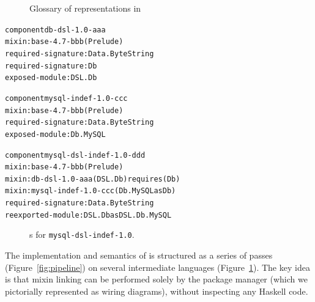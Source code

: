 \begin{figure}
\begin{mdframed}
\begin{description}
\end{description}
\caption{Glossary of representations in \Backpack{}}
\label{fig:glossary}
\end{mdframed}
\end{figure}

\newsavebox{\resolvedfullexample}
\begin{lrbox}{\resolvedfullexample}
\hspace{-1em}
\begin{minipage}{\linewidth}
\begin{alltt}
component db-dsl-1.0-aaa
 mixin: base-4.7-bbb (Prelude)
 required-signature: Data.ByteString
 required-signature: Db
 exposed-module: DSL.Db

component mysql-indef-1.0-ccc
 mixin: base-4.7-bbb (Prelude)
 required-signature: Data.ByteString
 exposed-module: Db.MySQL

component mysql-dsl-indef-1.0-ddd
 mixin: base-4.7-bbb (Prelude)
 mixin: db-dsl-1.0-aaa (DSL.Db) requires (Db)
 mixin: mysql-indef-1.0-ccc (Db.MySQL as Db)
 required-signature: Data.ByteString
 reexported-module: DSL.Db as DSL.Db.MySQL
\end{alltt}
\end{minipage}
\end{lrbox}

\begin{figure}
    \usebox{\resolvedfullexample}
  \caption{\Ccomp{}s for \texttt{mysql-dsl-indef-1.0}.}%
\label{fig:resolved-full-comps}
\end{figure}

The implementation and semantics of \Backpack{} is structured as a
series of passes (Figure~\ref{fig:pipeline}) on several intermediate
languages (Figure~\ref{fig:glossary}).  The key idea is that mixin
linking can be performed solely by the package manager (which we
pictorially represented as wiring diagrams), without inspecting any
Haskell code.

